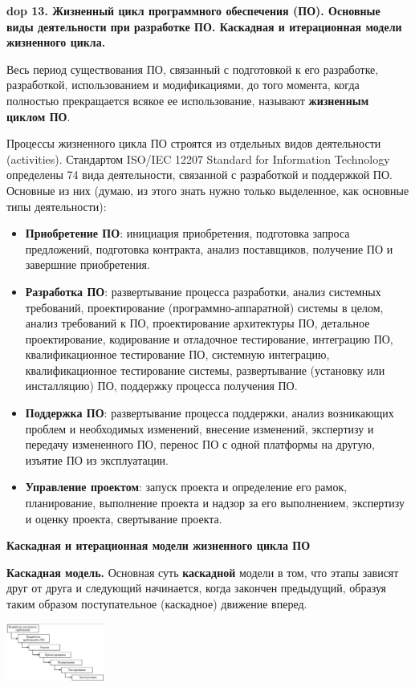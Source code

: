 \textbf{\LARGE dop 13. Жизненный  цикл  программного  обеспечения  (ПО).  Основные  виды  деятельности  при  разработке  ПО. Каскадная и итерационная модели жизненного цикла.}

Весь период существования ПО, связанный с подготовкой к его разработке, разработкой, использованием и модификациями, до того момента, когда полностью прекращается всякое ее использование, называют \textbf{жизненным циклом ПО}.

Процессы жизненного цикла ПО строятся из отдельных видов деятельности (activities).
Стандартом ISO/IEC 12207 Standard for Information Technology определены 74 вида деятельности, связанной с разработкой и поддержкой ПО.
Основные из них (думаю, из этого знать нужно только выделенное, как основные типы деятельности):
\begin{itemize}
    \item \textbf{Приобретение ПО}: инициация приобретения, подготовка запроса предложений, подготовка контракта, анализ поставщиков, получение ПО и завершние приобретения.
    \item \textbf{Разработка ПО}: развертывание процесса разработки, анализ системных требований, проектирование (программно-аппаратной) системы в целом, анализ требований к ПО, проектирование архитектуры ПО, детальное проектирование, кодирование и отладочное тестирование, интеграцию ПО, квалификационное тестирование ПО, системную интеграцию, квалификационное тестирование системы, развертывание (установку или инсталляцию) ПО, поддержку процесса получения ПО.
    \item \textbf{Поддержка ПО}: развертывание процесса поддержки, анализ возникающих проблем и необходимых изменений, внесение изменений, экспертизу и передачу измененного ПО, перенос ПО с одной платформы на другую, изъятие ПО из эксплуатации.
    \item \textbf{Управление проектом}: запуск проекта и определение его рамок, планирование, выполнение проекта и надзор за его выполнением, экспертизу и оценку проекта, свертывание проекта.
\end{itemize}

\textbf{Каскадная и итерационная модели жизненного цикла ПО}

\textbf{Каскадная модель.} Основная суть \textbf{каскадной} модели в том, что этапы зависят друг от друга и следующий начинается, когда закончен предыдущий, образуя таким образом поступательное (каскадное) движение вперед. 

\includegraphics[width=0.24\textwidth]{pics/cascade.png}

